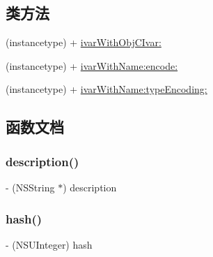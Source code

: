 \subsection*{类方法}
\begin{DoxyCompactItemize}
\item 
(instancetype) + \hyperlink{interface_m_a_r_ivar_ad1184e972c18423d2ea2c6c700a402c2}{ivar\+With\+Obj\+C\+Ivar\+:}
\item 
(instancetype) + \hyperlink{interface_m_a_r_ivar_a4987108bf34de429f1569446dfe0fefe}{ivar\+With\+Name\+:encode\+:}
\item 
(instancetype) + \hyperlink{interface_m_a_r_ivar_af65aa7a88a5831ae47f5e86213f61893}{ivar\+With\+Name\+:type\+Encoding\+:}
\end{DoxyCompactItemize}


\subsection{函数文档}
\mbox{\label{interface_m_a_r_ivar_a47c44d88f25acc48cc96ea3a5775c7c9}} 
\subsubsection{\texorpdfstring{description()}{description()}}
{\footnotesize\ttfamily -\/ (N\+S\+String $\ast$) description \begin{DoxyParamCaption}{ }\end{DoxyParamCaption}\hspace{0.3cm}{\ttfamily [implementation]}}

\mbox{\label{interface_m_a_r_ivar_a52d39d3a8d316e090b32c5bb63fbe0d6}} 
\subsubsection{\texorpdfstring{hash()}{hash()}}
{\footnotesize\ttfamily -\/ (N\+S\+U\+Integer) hash \begin{DoxyParamCaption}{ }\end{DoxyParamCaption}\hspace{0.3cm}{\ttfamily [implementation]}}

\mbox{\label{interface_m_a_r_ivar_a8667bca998283c79f25b8aa671a26f3e}} 
